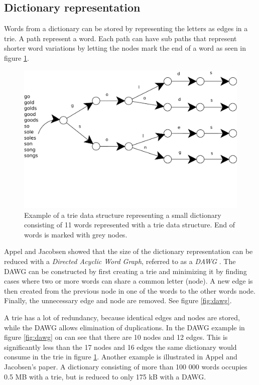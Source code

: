 \documentclass[a4paper, 12pt]{report}
\begin{document}
\subsection{Dictionary representation}
\label{dic-rep}
Words from a dictionary can be stored by representing the letters as edges in a trie. A path represent a word. Each path can have sub paths that represent shorter word variations by letting the nodes mark the end of a word as seen in figure \ref{fig:trie}. 

\begin{figure}[h]
\centering
\includegraphics[scale=1]{trie}
\caption{Example of a trie data structure representing a small dictionary consisting of 11 words represented with a trie data structure. End of words is marked with grey nodes.}
\label{fig:trie}
\end{figure}

Appel and Jacobsen showed that the size of the dictionary representation can be reduced with a \emph{Directed Acyclic Word Graph}, referred to as a \emph{DAWG} \cite{fastest}. The DAWG can be constructed by first creating a trie and minimizing it by finding cases where two or more words can share a common letter (node). A new edge is then created from the previous node in one of the words to the other words node. Finally, the unnecessary edge and node are removed. See figure \ref{fig:dawg}.

A trie has a lot of redundancy, because identical edges and nodes are stored, while the DAWG allows elimination of duplications. In the DAWG example in figure \ref{fig:dawg} on can see that there are 10 nodes and 12 edges. This is significantly less than the 17 nodes and 16 edges the same dictionary would consume in the trie in figure \ref{fig:trie}. Another example is illustrated in Appel and Jacobsen's paper\cite{fastest}. A dictionary consisting of more than 100 000 words occupies 0.5 MB with a trie, but is reduced to only 175 kB with a DAWG.
\end{document}
